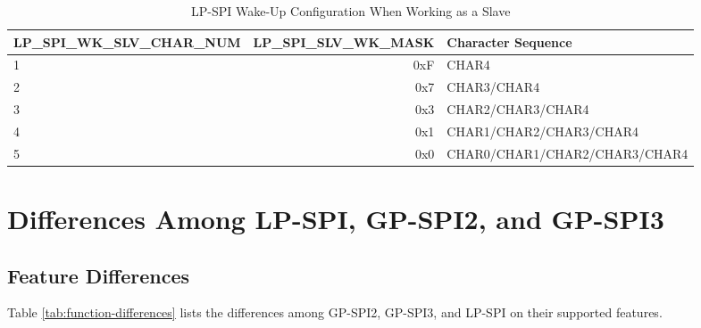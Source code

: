 \documentclass[main\_\_EN.tex]{subfiles}
\begin{document}
\begin{table}[H]
    \centering
    \caption{LP-SPI Wake-Up Configuration When Working as a Slave}
    \label{table:lpspi_sleep_wk}
    \begin{tabular}[c]{|p{5.0cm}|r|l|}
    \hline
    \rowcolor{lightgray}
    \textbf{LP\_SPI\_WK\_SLV\_CHAR\_NUM} & \textbf{LP\_SPI\_SLV\_WK\_MASK} & \textbf{Character Sequence} \\
    \hline
     1 &  0xF & CHAR4\\
     \hline
     2 &  0x7 & CHAR3/CHAR4 \\
    \hline
     3 &  0x3 & CHAR2/CHAR3/CHAR4 \\
    \hline
     4 &  0x1 & CHAR1/CHAR2/CHAR3/CHAR4 \\
    \hline
     5 &  0x0 & CHAR0/CHAR1/CHAR2/CHAR3/CHAR4 \\
    \hline
    \end{tabular}
\end{table}

\section{Differences Among LP-SPI, GP-SPI2, and GP-SPI3}\label{Subsection:Differences Between GP-SPI2 and GP-SPI3}

\subsection{Feature Differences}

Table \ref{tab:function-differences} lists the differences among GP-SPI2, GP-SPI3, and LP-SPI on their supported features.
\end{document}
